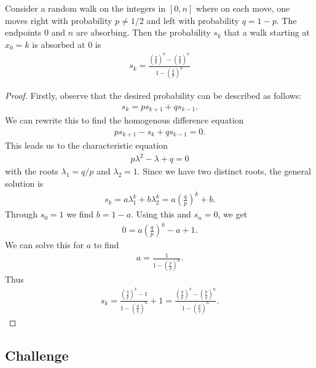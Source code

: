 \documentclass{article}
\begin{document}
\begin{claim*}
  Consider a random walk on the integers in $[0,n]$ where on each move, one moves right with
  probability $p\not=1/2$ and left with probability $q=1-p$. The endpoints $0$ and $n$ are absorbing.
  Then the probability $s_k$ that a walk starting at $x_0=k$ is absorbed at $0$ is
  \begin{align*}
    s_k = \frac{\left(\frac{q}{p}\right)^k-\left(\frac{q}{p}\right)^n}{1-\left(\frac{q}{p}\right)^n}
  \end{align*}
\end{claim*}
\begin{proof}
  Firstly, observe that the desired probability can be described as follows:
  \begin{align*}
    s_{k} = ps_{k+1} + qs_{k-1}.
  \end{align*}
  We can rewrite this to find the homogenous difference equation
  \begin{align*}
    ps_{k+1} - s_k + qs_{k-1} = 0.
  \end{align*}
  This leads us to the characteristic equation
  \begin{align*}
    p\lambda^2 - \lambda + q = 0
  \end{align*}
  with the roots $\lambda_1 = q/p$ and $\lambda_2 = 1$.
  Since we have two distinct roots, the general solution is
  \begin{align*}
    s_k = a\lambda_1^k + b\lambda_2^k = a\left(\frac{q}{p}\right)^k + b.
  \end{align*}
  Through $s_0=1$ we find $b=1-a$. Using this and $s_n=0$, we get
  \begin{align*}
    0 = a\left(\frac{q}{p}\right)^k - a + 1.
  \end{align*}
  We can solve this for $a$ to find
  \begin{align*}
    a = \frac{1}{1-\left(\frac{p}{q}\right)^n}.
  \end{align*}
  Thus
  \begin{align*}
    s_k =\frac{\left(\frac{q}{p}\right)^k-1}{1-\left(\frac{p}{q}\right)^n}+1
    =\frac{\left(\frac{q}{p}\right)^k-\left(\frac{p}{q}\right)^n}{1-\left(\frac{p}{q}\right)^n}.
  \end{align*}
\end{proof}

\subsection*{Challenge}
\end{document}
